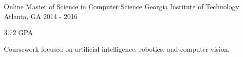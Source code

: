 


\begin{cventries}


\cventry
{Online Master of Science in Computer Science} %
{Georgia Institute of Technology} %
{Atlanta, GA} %
{2014 - 2016} %
{ %
\begin{cvitems}
\item {3.72 GPA}
\item {Coursework focused on artificial intelligence, robotics, and computer vision.}
\end{cvitems}
}


\end{cventries}
